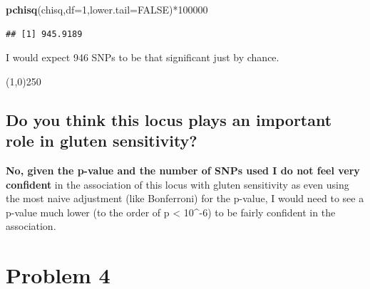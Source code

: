 \documentclass[]{article}
\newenvironment{Shaded}{\begin{snugshade}}{\end{snugshade}}
\newcommand{\KeywordTok}[1]{\textcolor[rgb]{0.13,0.29,0.53}{\textbf{{#1}}}}
\newcommand{\DataTypeTok}[1]{\textcolor[rgb]{0.13,0.29,0.53}{{#1}}}
\newcommand{\DecValTok}[1]{\textcolor[rgb]{0.00,0.00,0.81}{{#1}}}
\newcommand{\OtherTok}[1]{\textcolor[rgb]{0.56,0.35,0.01}{{#1}}}
\newcommand{\NormalTok}[1]{{#1}}
\begin{document}
\begin{Shaded}
\begin{Highlighting}[]
\KeywordTok{pchisq}\NormalTok{(chisq,}\DataTypeTok{df=}\DecValTok{1}\NormalTok{,}\DataTypeTok{lower.tail=}\OtherTok{FALSE}\NormalTok{)*}\DecValTok{100000}
\end{Highlighting}
\end{Shaded}

\begin{verbatim}
## [1] 945.9189
\end{verbatim}

I would expect 946 SNPs to be that significant just by chance.

\begin{center}
\line(1,0){250}
\end{center}

\subsection{Do you think this locus plays an important role in gluten
sensitivity?}\label{do-you-think-this-locus-plays-an-important-role-in-gluten-sensitivity}

\textbf{No, given the p-value and the number of SNPs used I do not feel
very confident} in the association of this locus with gluten sensitivity
as even using the most naive adjustment (like Bonferroni) for the
p-value, I would need to see a p-value much lower (to the order of p
\textless{} 10\^{}-6) to be fairly confident in the association.

\section{Problem 4}\label{problem-4}
\end{document}
